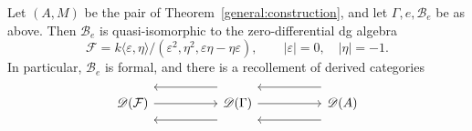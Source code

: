 \documentclass[11pt]{article}
\begin{document}
\begin{Koro}\label{dg:four-dimensional}
Let $(A,M)$ be the pair of Theorem~\ref{general:construction}, and
let $\Gamma,e,\mathcal B_e$ be as above. Then $\mathcal B_e$ is
quasi-isomorphic to the zero-differential dg algebra
\[
 \mathcal F=
 k\langle\varepsilon,\eta\rangle/
 (\varepsilon^2,\eta^2,\varepsilon\eta-\eta\varepsilon),
 \qquad |\varepsilon|=0,\quad |\eta|=-1.
\]
In particular, $\mathcal B_e$ is formal, and there is a recollement of derived categories
\[
\begin{tikzcd}[column sep=5em]
 \mathscr D(\mathcal F) \arrow[r]
 & \mathscr D(\Gamma)
   \arrow[l, shift right=3ex]
   \arrow[l, shift left=3ex]
   \arrow[r]
 & \mathscr D(A)
   \arrow[l, shift right=3ex]
   \arrow[l, shift left=3ex]
\end{tikzcd}
\]
\end{Koro}
\end{document}
